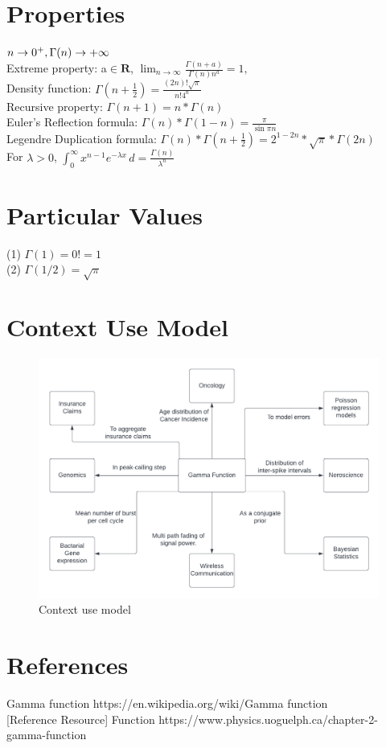 \documentclass{article}
\begin{document}
\section{Properties}
\indent\indent [1.] ${\displaystyle} n\to 0^+, {\displaystyle} \Gamma(n)\to+\infty$ \\

\indent [2.] Extreme property: a$\in\mathbf{R}$, $\lim_{n\to\infty} \frac{\Gamma(n+a)}{\Gamma(n)n^{a}} = 1, $ \\

\indent [3.] Density function: ${\displaystyle \Gamma \left(n+{\tfrac {1}{2}}\right)={\frac {(2n)!{\sqrt {\pi }}}{n!4^{n}}}}$ \\

\indent [4.] Recursive property: $\Gamma(n + 1)=n*\Gamma(n)$\\

\indent [5.] Euler's Reflection formula: $\Gamma(n)*\Gamma(1-n)=\frac{\pi}{\sin\pi n}$\\

\indent [6.] Legendre Duplication formula: $\Gamma(n)*\Gamma(n+\frac{1}{2})=2^{1-2n}*\sqrt{\pi}*\Gamma(2n)$\\

\indent [7.] For ${\lambda} > 0$, $ {\int _{0}^{\infty }x^{n-1}e^{-\lambda x}\,d} = \displaystyle \frac{\Gamma (n)}{\lambda^n}$\\

\section{Particular Values}
\indent\indent (1) $\Gamma(1) = 0! = 1$\\
\indent (2) $\Gamma(1/2) = \sqrt{\pi}$ \

\section{Context Use Model}

\begin{figure}[h]
    \centering
    \includegraphics[width=0.9\linewidth]{Images/contextmodel.png}
    \caption{Context use model}
    \label{fig:context use model}
\end{figure}

\section{References}
\indent{} Gamma function https://en.wikipedia.org/wiki/Gamma function\\

[Reference Resource] Function https://www.physics.uoguelph.ca/chapter-2-gamma-function\\
\end{document}
